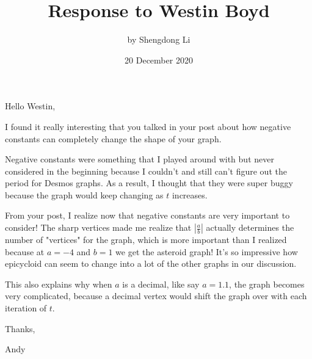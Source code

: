 \documentclass[12pt]{article}
\begin{document}
\title{Response to Westin Boyd}
\author{by Shengdong Li}
\date{20 December 2020}
\maketitle

Hello Westin,

I found it really interesting that you talked in your post about how negative constants can completely change the shape of your graph. 

Negative constants were something that I played around with but never considered in the beginning because I couldn't and still can't figure out the period for Desmos graphs. As a result, I thought that they were super buggy because the graph would keep changing as $t$ increases. 

From your post, I realize now that negative constants are very important to consider! The sharp vertices made me realize that $\left|\frac{a}{b}\right|$ actually determines the number of "vertices" for the graph, which is more important than I realized because at $a=-4$ and $b=1$ we get the asteroid graph! It's so impressive how epicycloid can seem to change into a lot of the other graphs in our discussion.

This also explains why when $a$ is a decimal, like say $a=1.1$, the graph becomes very complicated, because a decimal vertex would shift the graph over with each iteration of $t$.

Thanks, 

Andy
\end{document}
